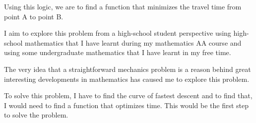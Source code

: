 {Using this logic, we are to find a function that minimizes the travel time from point A to point B.}

{I aim to explore this problem from a high-school student perspective using high-school mathematics that I have learnt during my mathematics AA course and using some undergraduate mathematics that I have learnt in my free time.}

{The very idea that a straightforward mechanics problem is a reason behind great interesting developments in mathematics has caused me to explore this problem.}

{To solve this problem, I have to find the curve of fastest descent and to find that, I would need to find a function that optimizes time. This would be the first step to solve the problem.}



